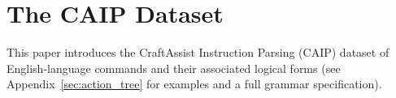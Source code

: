 \section{The CAIP Dataset}
\label{sec:data}

This paper introduces the CraftAssist Instruction Parsing (CAIP) dataset of English-language commands and their associated logical forms (see Appendix~\ref{sec:action_tree} for examples and a full grammar specification).  

